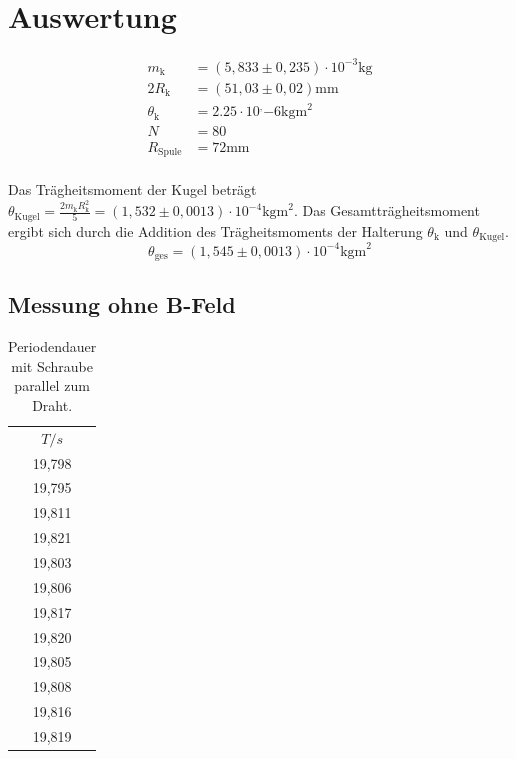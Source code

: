\section{Auswertung}
\label{sec:Auswertung}

\begin{align}
m_\mathrm{k}&=(5,833 \pm 0,235)\cdot 10^{-3} \si{\kilogram} \\
2R_\mathrm{k}&=(51,03 \pm 0,02) \si{\milli \meter} \\
\theta_\mathrm{k} &= 2.25 \cdot 10^‚{-6}   \si{\kilogram \meter}^2 \\
N &= 80 \\
R_\mathrm{Spule}&=72 \si{\milli \meter} \\
\end{align}

Das Trägheitsmoment der Kugel beträgt $\theta_\mathrm{Kugel} = \frac{2m_\mathrm{k} R_\mathrm{k}^2}{5} = (1,532 \pm 0,0013)\cdot 10^{-4} \si{\kilogram \meter}^2$. Das Gesamtträgheitsmoment ergibt sich durch die Addition des Trägheitsmoments der Halterung $\theta_\mathrm{k}$ und $\theta_\mathrm{Kugel}$.
\begin{equation}
  \theta_\mathrm{ges}=(1,545 \pm 0,0013)\cdot 10^{-4} \si{\kilogram \meter}^2
\end{equation}
\subsection{Messung ohne B-Feld}

\begin{table}
  \caption{Periodendauer mit Schraube parallel zum Draht.}
  \centering
  \label{tab:par}
  \begin{tabular}{c}
    \toprule
    $T/s$ \\
    19,798 \\
    19,795 \\
    19,811 \\
    19,821 \\
    19,803 \\
    19,806 \\
    19,817 \\
    19,820 \\
    19,805 \\
    19,808 \\
    19,816 \\
    19,819 \\
    \bottomrule
    \end{tabular}
    \end{table}


